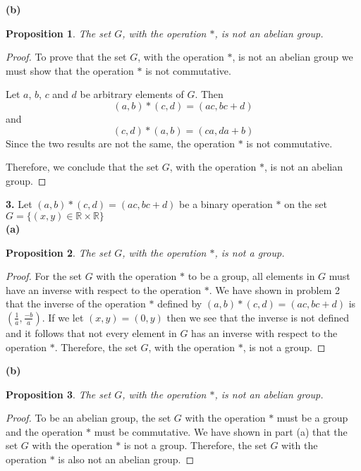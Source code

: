 \documentclass[12pt]{article}   %
\newtheorem*{proposition}{Proposition}  %
\begin{document}
\bigskip
\noindent\textbf{(b)}
\begin{proposition}
The set $G$, with the operation $\ast$, is not an abelian group.
\end{proposition}
\begin{proof}
To prove that the set $G$, with the operation $\ast$, is not an abelian group we must show that the operation $*$ is not commutative.

Let $a$, $b$, $c$ and $d$ be arbitrary elements of $G$. Then
\begin{equation}
(a,b) * (c,d) = (ac,bc+d)
\end{equation}
and
\begin{equation}
(c,d) * (a,b) = (ca, da+b)
\end{equation}
Since the two results are not the same, the operation $\ast$ is not commutative.

Therefore, we conclude that the set $G$, with the operation $\ast$, is not an abelian group.
\end{proof}

\noindent\textbf{3.} \quad Let $(a,b)*(c,d) = (ac, bc + d)$ be a binary operation $*$ on the set $G = \{(x,y) \in \mathbb{R} \times \mathbb{R}\}$ \\

\noindent\textbf{(a)}
\begin{proposition}
The set $G$, with the operation $\ast$, is not a group.
\end{proposition}
\begin{proof}
For the set $G$ with the operation $*$ to be a group, all elements in $G$ must have an inverse with respect to the operation $*$. We have shown in problem 2 that the inverse of the operation $*$ defined by $(a,b)*(c,d) = (ac, bc + d)$ is $(\tfrac{1}{a}, \tfrac{-b}{a})$. If we let $(x,y) = (0,y)$ then we see that the inverse is not defined and it follows that not every element in $G$ has an inverse with respect to the operation $*$. Therefore, the set $G$, with the operation $\ast$, is not a group.
\end{proof}

\bigskip
\noindent\textbf{(b)}
\begin{proposition}
The set $G$, with the operation $\ast$, is not an abelian group.
\end{proposition}
\begin{proof}
To be an abelian group, the set $G$ with the operation $*$ must be a group and the operation $*$ must be commutative. We have shown in part (a) that the set $G$ with the operation $*$ is not a group. Therefore, the set $G$ with the operation $*$ is also not an abelian group. 
\end{proof}
\bigskip
\end{document}
